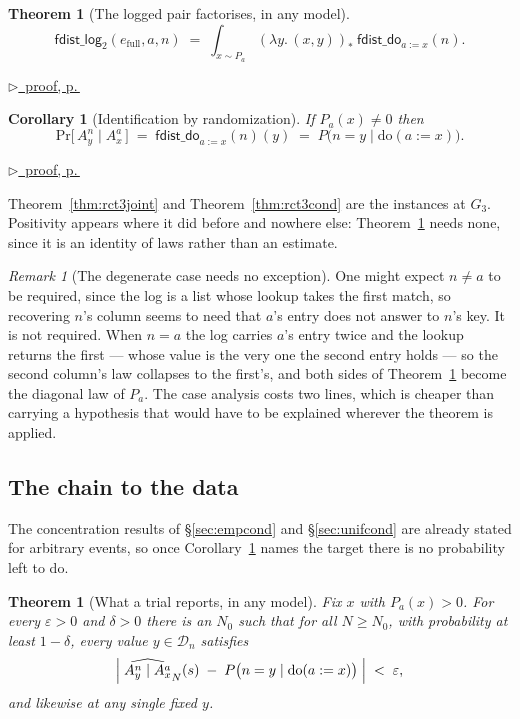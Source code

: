 \documentclass[11pt,a4paper]{article}
\theoremstyle{definition}
\theoremstyle{plain}
\newtheorem{theorem}[definition]{Theorem}
\newtheorem{corollary}[definition]{Corollary}
\theoremstyle{remark}
\newtheorem{remark}[definition]{Remark}
\newcommand{\dom}{\mathcal{D}}
\newcommand{\fdo}{\mathsf{fdist\_do}}
\newcommand{\push}[1]{{#1}_{*}}        %
\newcommand{\emp}[1]{\widehat{#1}}
\renewcommand{\Pr}{\mathrm{Pr}}
\newcommand{\pfref}[1]{%
  \par\smallskip\noindent
  \hyperref[pf:#1]{\small$\triangleright$\ proof, p.\,\pageref{pf:#1}}\par\smallskip}
\begin{document}
\begin{theorem}[The logged pair factorises, in any model]
\label{thm:randjoint}
\[
  \mathsf{fdist\_log}_2(e_{\mathrm{full}}, a, n)
  \;=\;
  \int_{x \sim P_a} \push{(\lambda y.\,(x,y))}\ \fdo_{a := x}(n) .
\]
\end{theorem}

\pfref{thm:randjoint}

\begin{corollary}[Identification by randomization]
\label{cor:randcond}
If $P_a(x) \neq 0$ then
\[
  \Pr\bigl[\,A^{n}_y \;\big|\; A^{a}_x\,\bigr]
  \;=\; \fdo_{a := x}(n)(y)
  \;=\; P\bigl(n = y \mid \mathrm{do}(a := x)\bigr).
\]
\end{corollary}

\pfref{cor:randcond}

Theorem~\ref{thm:rct3joint} and Theorem~\ref{thm:rct3cond} are the
instances at $G_3$. Positivity appears where it did before and nowhere
else: Theorem~\ref{thm:randjoint} needs none, since it is an identity of
laws rather than an estimate.

\begin{remark}[The degenerate case needs no exception]
\label{rem:distinct}
One might expect $n \neq a$ to be required, since the log is a list whose
lookup takes the first match, so recovering $n$'s column seems to need
that $a$'s entry does not answer to $n$'s key. It is not required. When
$n = a$ the log carries $a$'s entry twice and the lookup returns the
first --- whose value is the very one the second entry holds --- so the
second column's law collapses to the first's, and both sides of
Theorem~\ref{thm:randjoint} become the diagonal law of $P_a$. The
case analysis costs two lines, which is cheaper than carrying a
hypothesis that would have to be explained wherever the theorem is
applied.
\end{remark}

\subsection{The chain to the data}
\label{sec:genemp}

The concentration results of \S\ref{sec:empcond} and \S\ref{sec:unifcond}
are already stated for arbitrary events, so once
Corollary~\ref{cor:randcond} names the target there is no probability left
to do.

\begin{theorem}[What a trial reports, in any model]
\label{thm:randemp}
Fix $x$ with $P_a(x) > 0$. For every $\varepsilon > 0$ and $\delta > 0$
there is an $N_0$ such that for all $N \ge N_0$, with probability at least
$1 - \delta$, \emph{every} value $y \in \dom_n$ satisfies
\[
  \Bigl|\;\emp{A^{n}_y \mid A^{a}_x}_N(s)
  \;-\; P\bigl(n = y \mid \mathrm{do}(a := x)\bigr)\;\Bigr|
  \;<\; \varepsilon ,
\]
and likewise at any single fixed $y$.
\end{theorem}
\end{document}
